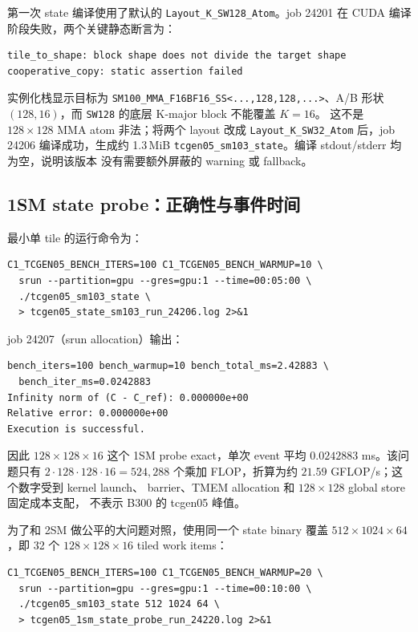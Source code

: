 \documentclass[11pt,a4paper,fontset=none]{ctexart}
\newcommand{\code}[1]{\texttt{#1}}
\begin{document}
第一次 state 编译使用了默认的 \code{Layout\_K\_SW128\_Atom}。job 24201
在 CUDA 编译阶段失败，两个关键静态断言为：

\begin{lstlisting}
tile_to_shape: block shape does not divide the target shape
cooperative_copy: static assertion failed
\end{lstlisting}

实例化栈显示目标为
\code{SM100\_MMA\_F16BF16\_SS<...,128,128,...>}、A/B 形状
\((128,16)\)，而 \code{SW128} 的底层 K-major block 不能覆盖 \(K=16\)。
这不是 \(128\times128\) MMA atom 非法；将两个 layout 改成
\code{Layout\_K\_SW32\_Atom} 后，job 24206 编译成功，生成约 1.3\,MiB
\texttt{tcgen05\_sm103\_state}。编译 stdout/stderr 均为空，说明该版本
没有需要额外屏蔽的 warning 或 fallback。

\subsection{1SM state probe：正确性与事件时间}

最小单 tile 的运行命令为：

\begin{lstlisting}
C1_TCGEN05_BENCH_ITERS=100 C1_TCGEN05_BENCH_WARMUP=10 \
  srun --partition=gpu --gres=gpu:1 --time=00:05:00 \
  ./tcgen05_sm103_state \
  > tcgen05_state_sm103_run_24206.log 2>&1
\end{lstlisting}

job 24207（srun allocation）输出：

\begin{lstlisting}
bench_iters=100 bench_warmup=10 bench_total_ms=2.42883 \
  bench_iter_ms=0.0242883
Infinity norm of (C - C_ref): 0.000000e+00
Relative error: 0.000000e+00
Execution is successful.
\end{lstlisting}

因此 \(128\times128\times16\) 这个 1SM probe exact，单次 event 平均
\(0.0242883\) ms。该问题只有 \(2\cdot128\cdot128\cdot16=524,288\)
个乘加 FLOP，折算为约 \(21.59\) GFLOP/s；这个数字受到 kernel launch、
barrier、TMEM allocation 和 \(128\times128\) global store 固定成本支配，
不表示 B300 的 tcgen05 峰值。

为了和 2SM 做公平的大问题对照，使用同一个 state binary 覆盖
\(512\times1024\times64\)，即 32 个 \(128\times128\times16\) tiled
work items：

\begin{lstlisting}
C1_TCGEN05_BENCH_ITERS=100 C1_TCGEN05_BENCH_WARMUP=20 \
  srun --partition=gpu --gres=gpu:1 --time=00:10:00 \
  ./tcgen05_sm103_state 512 1024 64 \
  > tcgen05_1sm_state_probe_run_24220.log 2>&1
\end{lstlisting}
\end{document}
